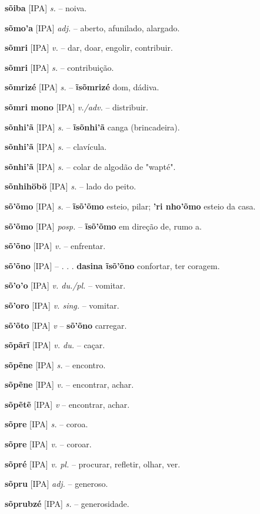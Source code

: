 \textbf{sõiba} [IPA] \textit{s.} -- noiva.

\textbf{sõmo'a} [IPA] \textit{adj.} -- aberto, afunilado, alargado.

\textbf{sõmri} [IPA] \textit{v.} -- dar, doar, engolir, contribuir.

\textbf{sõmri} [IPA] \textit{s.} -- contribuição.

\textbf{sõmrizé} [IPA] \textit{s.} -- \textbf{ĩsõmrizé} dom, dádiva.

\textbf{sõmri mono} [IPA] \textit{v./adv.} -- distribuir.

\textbf{sõnhi'ã} [IPA] \textit{s.} -- \textbf{ĩsõnhi'ã} canga (brincadeira).

\textbf{sõnhi'ã} [IPA] \textit{s.} -- clavícula.

\textbf{sõnhi'ã} [IPA] \textit{s.} -- colar de algodão de "wapté".

\textbf{sõnhihöbö} [IPA] \textit{s.} -- lado do peito.

\textbf{sõ'õmo} [IPA] \textit{s.} -- \textbf{ĩsõ'õmo} esteio, pilar; \textbf{'ri nho'õmo} esteio da casa.

\textbf{sõ'õmo} [IPA] \textit{posp.} -- \textbf{ĩsõ'õmo} em direção de, rumo a.

\textbf{sõ'õno} [IPA] \textit{v.} -- enfrentar.

\textbf{sõ'õno} [IPA] \textit{} -- . . . \textbf{dasina ĩsõ'õno} confortar, ter coragem.

\textbf{sõ'o'o} [IPA] \textit{v. du./pl.} -- vomitar.

\textbf{sõ'oro} [IPA] \textit{v. sing.} -- vomitar.

\textbf{sõ'õto} [IPA] \textit{v} -- \textbf{sõ'õno} carregar.

\textbf{sõpãrĩ} [IPA] \textit{v. du.} -- caçar.

\textbf{sõpẽne} [IPA] \textit{s.} -- encontro.

\textbf{sõpẽne} [IPA] \textit{v.} -- encontrar, achar.

\textbf{sõpẽtẽ} [IPA] \textit{v} -- encontrar, achar.

\textbf{sõpre} [IPA] \textit{s.} -- coroa.

\textbf{sõpre} [IPA] \textit{v.} -- coroar.

\textbf{sõpré} [IPA] \textit{v. pl.} -- procurar, refletir, olhar, ver.

\textbf{sõpru} [IPA] \textit{adj.} -- generoso.

\textbf{sõprubzé} [IPA] \textit{s.} -- generosidade.

